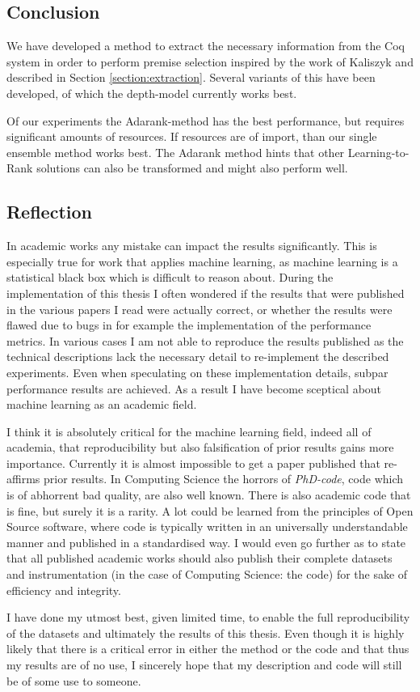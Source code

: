 \subsection{Conclusion}
We have developed a method to extract the necessary information from the Coq system in order to perform premise selection
inspired by the work of Kaliszyk and described in Section \ref{section:extraction}.
Several variants of this have been developed, of which the depth-model currently works best.

Of our experiments the Adarank-method has the best performance, but requires significant amounts of resources.
If resources are of import, than our single ensemble method works best.
The Adarank method hints that other Learning-to-Rank solutions can also be transformed and might also perform well.


\subsection{Reflection}
In academic works any mistake can impact the results significantly.
This is especially true for work that applies machine learning, as machine learning is a statistical black box which
is difficult to reason about.
During the implementation of this thesis I often wondered if the results that were published in the various papers I read
were actually correct, or whether the results were flawed due to bugs in for example the implementation of the
performance metrics.
In various cases I am not able to reproduce the results published as the technical descriptions lack the necessary detail
to re-implement the described experiments.
Even when speculating on these implementation details, subpar performance results are achieved.
As a result I have become sceptical about machine learning as an academic field.

I think it is absolutely critical for the machine learning field, indeed all of academia,
that reproducibility but also falsification of prior results gains more importance.
Currently it is almost impossible to get a paper published that re-affirms prior results.
In Computing Science the horrors of \emph{PhD-code}, code which is of abhorrent bad quality, are also well known.
There is also academic code that is fine, but surely it is a rarity.
A lot could be learned from the principles of Open Source software, where code is typically written
in an universally understandable manner and published in a standardised way.
I would even go further as to state that all published academic works should also publish
their complete datasets and instrumentation (in the case of Computing Science: the code)
for the sake of efficiency and integrity.

I have done my utmost best, given limited time, to enable the full reproducibility of
the datasets and ultimately the results of this thesis.
Even though it is highly likely that there is a critical error in either the method
or the code and that thus my results are of no use,
I sincerely hope that my description and code will still be of some use to someone.